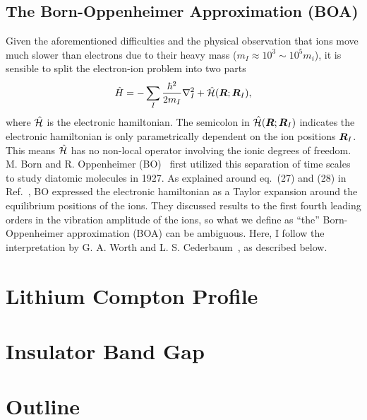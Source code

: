 \subsection{The Born-Oppenheimer Approximation (BOA)}
Given the aforementioned difficulties and the physical observation that ions move much slower than electrons due to their heavy mass ($m_I\approx 10^3\sim 10^5 m_i$), it is sensible to split the electron-ion problem into two parts
\begin{align} \label{eq:intro-ei-to-e-ham}
\hat{H} = -\sum_I \frac{\hbar^2}{2m_I} \nabla^2_I
+ \hat{\mathcal{H}}(\boldsymbol{R};\boldsymbol{R}_I),
\end{align}
where $\hat{\mathcal{H}}$ is the electronic hamiltonian. The semicolon in $\hat{\mathcal{H}}(\boldsymbol{R};\boldsymbol{R}_I)$ indicates the electronic hamiltonian is only parametrically dependent on the ion positions $\boldsymbol{R}_I$. This means $\hat{\mathcal{H}}$ has no non-local operator involving the ionic degrees of freedom. M. Born and R. Oppenheimer (BO)~\cite{Born1927} first utilized this separation of time scales to study diatomic molecules in 1927. As explained around eq.~(27) and (28) in Ref.~\cite{Born1927}, BO expressed the electronic hamiltonian as a Taylor expansion around the equilibrium positions of the ions. They discussed results to the first fourth leading orders in the vibration amplitude of the ions, so what we define as ``the'' Born-Oppenheimer approximation (BOA) can be ambiguous. Here, I follow the interpretation by G. A. Worth and L. S. Cederbaum~\cite{Worth2004}, as described below.



\section{Lithium Compton Profile}
\section{Insulator Band Gap}
\section{Outline}